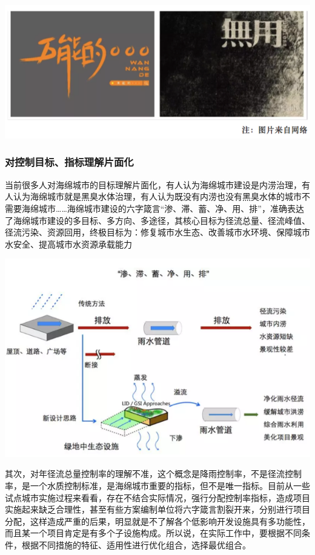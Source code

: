 \documentclass[]{book}
\begin{document}
\includegraphics[width=8.33in]{images/hm3}

\subsubsection{对控制目标、指标理解片面化}

当前很多人对海绵城市的目标理解片面化，有人认为海绵城市建设是内涝治理，有人认为海绵城市就是黑臭水体治理，有人认为既没有内涝也没有黑臭水体的城市不需要海绵城市\ldots{}\ldots{}海绵城市建设的六字箴言``渗、滞、蓄、净、用、排''，准确表达了海绵城市建设的多目标、多方向、多途径，其核心目标为径流总量、径流峰值、径流污染、资源回用，终极目标为：修复城市水生态、改善城市水环境、保障城市水安全、提高城市水资源承载能力

\includegraphics[width=8.33in]{images/hm4}

其次，对年径流总量控制率的理解不准，这个概念是降雨控制率，不是径流控制率，是一个水质控制标准，是海绵城市重要的指标，但不是唯一指标。目前从一些试点城市实施过程来看看，存在不结合实际情况，强行分配控制率指标，造成项目实施起来缺乏合理性，甚至有些方案编制单位将六字箴言割裂开来，分别进行项目分配，这样造成严重的后果，明显就是不了解各个低影响开发设施具有多功能性，而且某一个项目肯定是有多个子设施构成。所以说，在实际工作中，要根据不同条件，根据不同措施的特征、适用性进行优化组合，选择最优组合。
\end{document}
